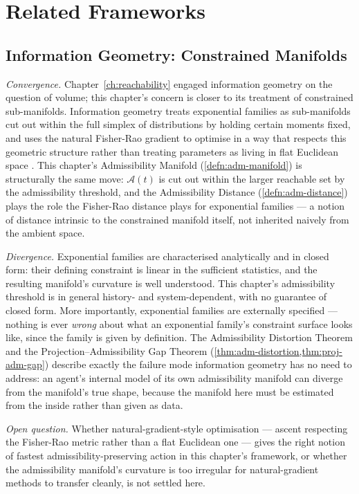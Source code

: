 \documentclass[12pt,twoside,openright]{book}
\newcommand{\adm}{\mathcal{A}}
\begin{document}
\section{Related Frameworks}
\label{sec:ch14-related-frameworks}

\subsection*{Information Geometry: Constrained Manifolds}

\emph{Convergence.} Chapter~\ref{ch:reachability} engaged
information geometry on the question of volume; this chapter's
concern is closer to its treatment of constrained sub-manifolds.
Information geometry treats exponential families as sub-manifolds
cut out within the full simplex of distributions by holding
certain moments fixed, and uses the natural Fisher-Rao gradient
to optimise in a way that respects this geometric structure
rather than treating parameters as living in flat Euclidean space
\parencite{amari2016,ay2017}. This chapter's Admissibility
Manifold (\cref{defn:adm-manifold}) is structurally the same
move: $\adm(t)$ is cut out within the larger reachable set by the
admissibility threshold, and the Admissibility Distance
(\cref{defn:adm-distance}) plays the role the Fisher-Rao distance
plays for exponential families --- a notion of distance intrinsic
to the constrained manifold itself, not inherited naively from
the ambient space.

\emph{Divergence.} Exponential families are characterised
analytically and in closed form: their defining constraint is
linear in the sufficient statistics, and the resulting manifold's
curvature is well understood. This chapter's admissibility
threshold is in general history- and system-dependent, with no
guarantee of closed form. More importantly, exponential families
are externally specified --- nothing is ever \emph{wrong} about
what an exponential family's constraint surface looks like, since
the family is given by definition. The Admissibility Distortion
Theorem and the Projection--Admissibility Gap Theorem
(\cref{thm:adm-distortion,thm:proj-adm-gap}) describe exactly the
failure mode information geometry has no need to address: an
agent's internal model of its own admissibility manifold can
diverge from the manifold's true shape, because the manifold here
must be estimated from the inside rather than given as data.

\emph{Open question.} Whether natural-gradient-style optimisation
--- ascent respecting the Fisher-Rao metric rather than a flat
Euclidean one --- gives the right notion of fastest
admissibility-preserving action in this chapter's framework, or
whether the admissibility manifold's curvature is too irregular
for natural-gradient methods to transfer cleanly, is not settled
here.
\end{document}
